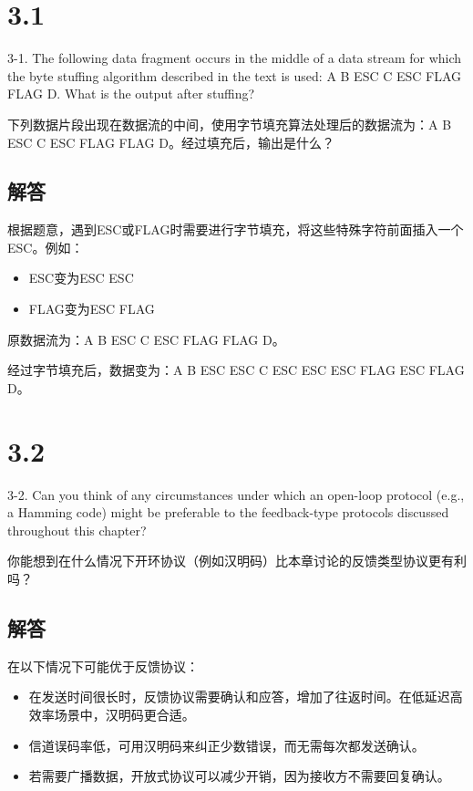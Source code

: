 \section{3.1}

3-1. The following data fragment occurs in the middle of a data stream for which the byte stuffing algorithm described in the text is used: A B ESC C ESC FLAG FLAG D. What is the output after stuffing?

下列数据片段出现在数据流的中间，使用字节填充算法处理后的数据流为：A B ESC C ESC FLAG FLAG D。经过填充后，输出是什么？

\subsection*{解答}

根据题意，遇到ESC或FLAG时需要进行字节填充，将这些特殊字符前面插入一个ESC。例如：

\begin{itemize}
  \item ESC变为ESC ESC
  \item FLAG变为ESC FLAG
\end{itemize}

原数据流为：A B ESC C ESC FLAG FLAG D。

经过字节填充后，数据变为：A B ESC ESC C ESC ESC ESC FLAG ESC FLAG D。

\section{3.2}

3-2. Can you think of any circumstances under which an open-loop protocol (e.g., a Hamming code) might be preferable to the feedback-type protocols discussed throughout this chapter?

你能想到在什么情况下开环协议（例如汉明码）比本章讨论的反馈类型协议更有利吗？

\subsection*{解答}

在以下情况下可能优于反馈协议：

\begin{itemize}
  \item 在发送时间很长时，反馈协议需要确认和应答，增加了往返时间。在低延迟高效率场景中，汉明码更合适。
  \item 信道误码率低，可用汉明码来纠正少数错误，而无需每次都发送确认。
  \item 若需要广播数据，开放式协议可以减少开销，因为接收方不需要回复确认。
\end{itemize}


